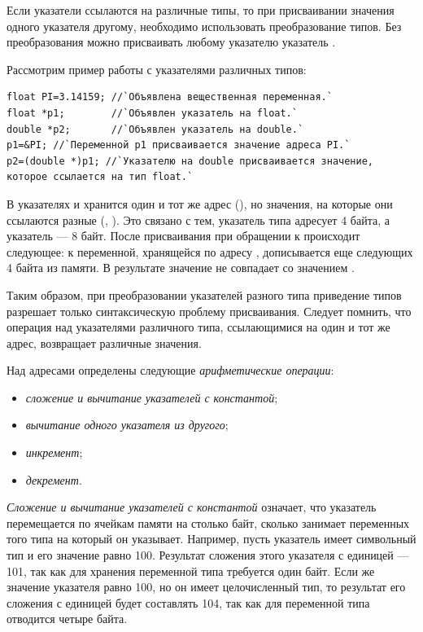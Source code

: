 Если указатели ссылаются на различные типы, то при присваивании значения одного указателя другому, необходимо
использовать преобразование типов. Без преобразования можно присваивать любому указателю указатель
. 

Рассмотрим пример работы с указателями различных типов:
\begin{lstlisting}
float PI=3.14159; //`Объявлена вещественная переменная.`
float *p1;        //`Объявлен указатель на float.`
double *p2;       //`Объявлен указатель на double.`
p1=&PI; //`Переменной p1 присваивается значение адреса PI.`
p2=(double *)p1; //`Указателю на double присваивается значение, которое ссылается на тип float.`
\end{lstlisting}

В указателях  и  хранится один и тот же адрес
(), но значения, на которые они ссылаются разные (,
). Это связано с тем, указатель типа  адресует 4 байта, а
указатель  --- 8 байт. После присваивания  при обращении к
 происходит следующее: к переменной, хранящейся по адресу , дописывается еще
следующих 4 байта из памяти. В результате значение  не совпадает со значением
.

Таким образом, при преобразовании указателей разного типа приведение типов разрешает только синтаксическую проблему
присваивания. Следует помнить, что операция \Sys{*} над указателями различного типа, ссылающимися на один
и тот же адрес, возвращает различные значения.

Над адресами  определены следующие
\emph{арифметические операции}:

\begin{itemize}
\item {}\emph{сложение и вычитание указателей с
константой};
\item {}\emph{вычитание одного указателя из другого};
\item {}\emph{инкремент};
\item {}\emph{декремент}.
\end{itemize}

\emph{Сложение и вычитание указателей с константой}  означает, что указатель
перемещается по ячейкам памяти на столько байт, сколько занимает  переменных того типа на который
он указывает. Например, пусть указатель имеет символьный тип и его значение равно 100. Результат сложения этого
указателя с единицей --- 101, так как для хранения переменной типа  требуется один байт. Если же
значение указателя равно 100, но он имеет целочисленный тип, то результат его сложения с единицей будет составлять 104,
так как для переменной типа  отводится четыре байта.

